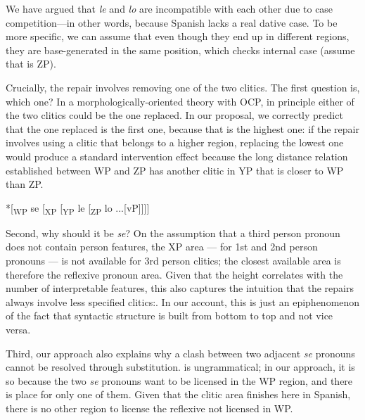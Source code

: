 \documentclass[output=paper,modfonts,nonflat,newtxmath,colorlinks,citecolor=brown]{langsci/langscibook}
\begin{document}
       

We have argued that \textit{le} and \textit{lo} are incompatible with each other due to case competition—in other words, because Spanish lacks a real dative case. To be more specific, we can assume that even though they end up in different regions, they are base-generated in the same position, which checks internal case (assume that is ZP). 

Crucially, the repair involves removing one of the two clitics. The first question is, which one? In a morphologically-oriented theory with OCP, in principle either of the two clitics could be the one replaced. In our proposal, we correctly predict that the one replaced is the first one, because that is the highest one: if the repair involves using a clitic that belongs to a higher region, replacing the lowest one would produce a standard intervention effect because the long distance relation established between WP and ZP has another clitic in YP that is closer to WP than ZP.

\ea%
    \label{ex:cabre:24}
    *[\textsubscript{WP}   se  [\textsubscript{XP}  [\textsubscript{YP}  le  [\textsubscript{ZP}  lo ...[vP]]]]
   
    \z

         
Second, why should it be \textit{se}? On the assumption that a third person pronoun does not contain person features, the XP area — for 1st and 2nd person pronouns — is not available for 3rd person clitics; the closest available area is therefore the reflexive pronoun area. Given that the height correlates with the number of interpretable features, this also captures the intuition that the repairs always involve less specified clitics:. In our account, this is just an epiphenomenon of the fact that syntactic structure is built from bottom to top and not vice versa.

Third, our approach also explains why a clash between two adjacent \textit{se} pronouns cannot be resolved through substitution.  is ungrammatical; in our approach, it is so because the two \textit{se} pronouns want to be licensed in the WP region, and there is place for only one of them. Given that the clitic area finishes here in Spanish, there is no other region to license the reflexive not licensed in WP.

    \z
\end{document}
